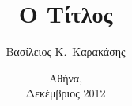 \documentclass[greek,diploma]{cslabthesis}
\author{Βασίλειος Κ.\ Καρακάσης}
\title{Ο Τίτλος}
\date{Αθήνα, \\ Δεκέμβριος 2012}
\begin{document}
\maketitle




\frontmatter


\cleardoublepage


\cleardoublepage
\tableofcontents

\cleardoublepage
\listoffigures

\cleardoublepage
\listoftables

\cleardoublepage
\listofalgorithms





\mainmatter


\backmatter

\cleardoublepage
\printindex
\end{document}

